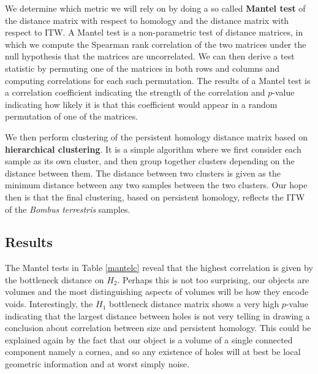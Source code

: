 We determine which metric we will rely on by doing a so called \textbf{Mantel test} \cite[p. ~813]{mantel} of the distance matrix with respect to homology and the distance matrix with respect to ITW. A Mantel test is a non-parametric test of distance matrices, in which we compute the Spearman rank correlation of the two matrices under the null hypothesis that the matrices are uncorrelated. We can then derive a test statistic by permuting one of the matrices in both rows and columns and computing correlations for each such permutation.  The results of a Mantel test is a correlation coefficient indicating the strength of the correlation and $p$-value indicating how likely it is  that this coefficient would appear in a random permutation of one of the matrices.

We then perform clustering of the persistent homology distance matrix based on \textbf{hierarchical clustering}. It is a simple algorithm where we first consider each sample as its own cluster, and then group together clusters depending on the distance between them. The distance between two clusters is given as the minimum distance between any two samples between the two clusters. Our hope then is that the final clustering, based on persistent homology, reflects the ITW of the \textit{Bombus terrestris} samples.


\subsection{Results}
The Mantel tests in Table \ref{mantelc} reveal that the highest correlation is given by the bottleneck distance on $H_{2}$. Perhaps this is not too surprising, our objects are volumes and the most distinguishing aspects of volumes will be how they encode voids. Interestingly, the $H_{1}$ bottleneck distance matrix shows a very high $p$-value indicating that the largest distance between holes is not very telling in drawing a conclusion about correlation between size and persistent homology. This could be explained again by the fact that our object is a volume of a single connected component namely a cornea, and so any existence of holes will at best be local geometric information and at worst simply noise.

